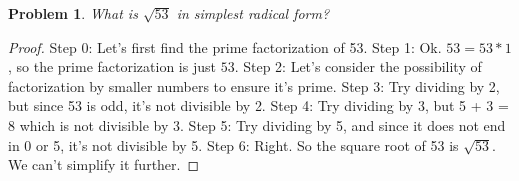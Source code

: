 \documentclass{article}
\newtheorem{theorem}{Problem}
\begin{document}
\begin{theorem}
What is $\sqrt{53}$ in simplest radical form?
\end{theorem}

\begin{proof}
Step 0: Let's first find the prime factorization of 53.
Step 1: Ok. $53 = 53 * 1$, so the prime factorization is just $53$.
Step 2: Let's consider the possibility of factorization by smaller numbers to ensure it's prime.
Step 3: Try dividing by 2, but since 53 is odd, it's not divisible by 2.
Step 4: Try dividing by 3, but 5 + 3 = 8 which is not divisible by 3.
Step 5: Try dividing by 5, and since it does not end in 0 or 5, it's not divisible by 5.
Step 6: Right. So the square root of 53 is $\sqrt{53}$. We can't simplify it further.
\end{proof}
\end{document}
